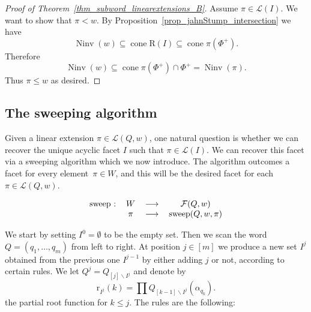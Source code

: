 \documentclass{amsart}
\theoremstyle{definition}
\DeclareMathOperator{\cone}{cone} %
\DeclareMathOperator{\Ninv}{Ninv} %
\newcommand{\linearExtensions}{\mathcal{L}} %
\newcommand{\Roots}{\mathrm{R}} %
\newcommand{\rootFunction}[2]{\mathrm{r}_{#1}(#2)} %
\newcommand{\subwordFacets}{\mathcal{F}} %
\newcommand{\sweepingAlgorithm}{\mathrm{sweep}} %
\begin{document}
\begin{proof}[Proof of Theorem~\ref{thm_subword_linearextensions_B}]
Assume $\pi\in \linearExtensions(I)$. 
We want to show that $\pi<w$. 
By Proposition~\ref{prop_jahnStump_intersection} we have 
\[
\Ninv(w) 
\subseteq \cone \Roots(I) 
\subseteq \cone \pi(\Phi^+).
\]
Therefore
\[
\Ninv(w) 
\subseteq \cone \pi(\Phi^+) \cap \Phi^+ 
= \Ninv(\pi).
\]
Thus $\pi \leq w$ as desired.
\end{proof}




\subsection{The sweeping algorithm}

Given a linear extension $\pi \in \linearExtensions(Q,w)$, one natural question is whether we can recover the unique acyclic facet $I$ such that $\pi \in \linearExtensions(I)$.
We can recover this facet via a sweeping algorithm which we now introduce. 
The algorithm outcomes a facet for every element~$\pi \in W$, and this will be the desired facet for each $\pi \in \linearExtensions(Q,w)$. 

\[
\begin{tabular}{cccc}
$\sweepingAlgorithm$ : & $W$  &$\longrightarrow$ &$\subwordFacets(Q,w)$\\
    & $\pi$ & $\longrightarrow$ & $\sweepingAlgorithm(Q,w,\pi)$
\end{tabular}
\]



We start by setting $I^0=\emptyset$ to be the empty set. 
Then we scan the word $Q=(q_1,\dots ,q_m)$ from left to right. At position $j\in [m]$ we produce a new set $I^j$ obtained from the previous one $I^{j-1}$ by either adding $j$ or not, according to certain rules. 
We let $Q^j=Q_{[j]\smallsetminus I^j}$ and denote by
    \[
    \rootFunction{I^j}{k} = \prod Q_{[k-1]\smallsetminus I^j}(\alpha_{q_k}).
    \]
the partial root function for $k\leq j$.   
The rules are the following:
\end{document}
